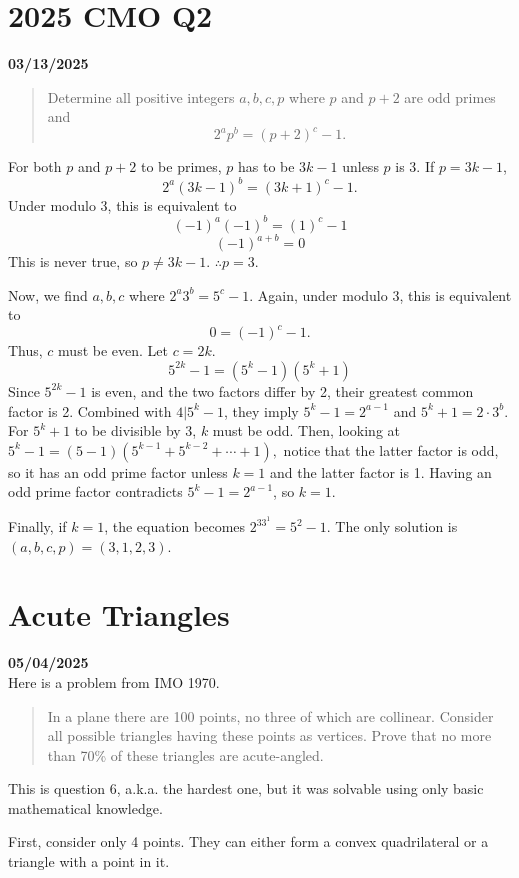 \documentclass[12pt, oneside]{article}
\begin{document}
\section*{2025 CMO Q2}
\textbf{03/13/2025}
\begin{quote}
Determine all positive integers $a, b, c, p$ where $p$ and $p + 2$ are odd primes and
\[2^ap^b = (p + 2)^c - 1.\]
\end{quote}
For both $p$ and $p+2$ to be primes, $p$ has to be $3k-1$ unless $p$ is 3. If $p=3k-1$,
\[2^a(3k-1)^b = (3k + 1)^c - 1.\]
Under modulo 3, this is equivalent to
\[(-1)^a(-1)^b = (1)^c - 1\]
\[(-1)^{a+b} = 0\]
This is never true, so $p \neq 3k-1$. $\therefore p=3$.

Now, we find $a, b, c$ where $2^a3^b = 5^c - 1$. Again, under modulo 3, this is equivalent to
\[0 = (-1)^c - 1.\]
Thus, $c$ must be even. Let $c=2k$.
\[5^{2k} - 1 = (5^k - 1) (5^k + 1)\]
Since $5^{2k}-1$ is even, and the two factors differ by 2, their greatest common factor is 2. Combined with $4|5^k-1$, they imply $5^k-1 = 2^{a-1}$ and $5^k+1 = 2 \cdot 3^b$. For $5^k+1$ to be divisible by 3, $k$ must be odd. Then, looking at $5^k -1 = (5 - 1)(5^{k-1} + 5^{k-2} + \cdots + 1), $ notice that the latter factor is odd, so it has an odd prime factor unless $k=1$ and the latter factor is 1. Having an odd prime factor contradicts $5^k -1 = 2^{a-1}$, so $k=1$.

Finally, if $k=1$, the equation becomes $2^33^1 = 5^2 - 1$. The only solution is $(a, b, c, p) = (3, 1, 2, 3)$.
\section*{Acute Triangles}
\textbf{05/04/2025}\\
Here is a problem from IMO 1970.
\begin{quote}
In a plane there are 100 points, no three of which are collinear. Consider all
possible triangles having these points as vertices. Prove that no more than
70\% of these triangles are acute-angled.
\end{quote}
This is question 6, a.k.a. the hardest one, but it was solvable using only basic mathematical knowledge.

First, consider only 4 points. They can either form a convex quadrilateral or a triangle with a point in it. 
\end{document}
